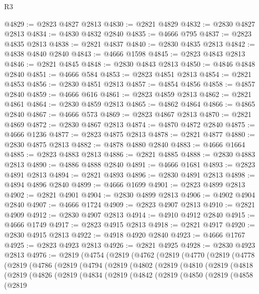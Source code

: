 \begin{lexlean}{R3}
\begin{coremodule}
@4829 := @2823 @4827 @2813
@4830 := @2821 @4829
@4832 := @2830 @4827 @2813
@4834 := @4830 @4832 @2840
@4835 := @4666 @795
@4837 := @2823 @4835 @2813
@4838 := @2821 @4837
@4840 := @2830 @4835 @2813
@4842 := @4838 @4840 @2840
@4843 := @4666 @1598
@4845 := @2823 @4843 @2813
@4846 := @2821 @4845
@4848 := @2830 @4843 @2813
@4850 := @4846 @4848 @2840
@4851 := @4666 @584
@4853 := @2823 @4851 @2813
@4854 := @2821 @4853
@4856 := @2830 @4851 @2813
@4857 := @4854 @4856
@4858 := @4857 @2840
@4859 := @4666 @616
@4861 := @2823 @4859 @2813
@4862 := @2821 @4861
@4864 := @2830 @4859 @2813
@4865 := @4862 @4864
@4866 := @4865 @2840
@4867 := @4666 @573
@4869 := @2823 @4867 @2813
@4870 := @2821 @4869
@4872 := @2830 @4867 @2813
@4874 := @4870 @4872 @2840
@4875 := @4666 @1236
@4877 := @2823 @4875 @2813
@4878 := @2821 @4877
@4880 := @2830 @4875 @2813
@4882 := @4878 @4880 @2840
@4883 := @4666 @1664
@4885 := @2823 @4883 @2813
@4886 := @2821 @4885
@4888 := @2830 @4883 @2813
@4890 := @4886 @4888 @2840
@4891 := @4666 @1681
@4893 := @2823 @4891 @2813
@4894 := @2821 @4893
@4896 := @2830 @4891 @2813
@4898 := @4894 @4896 @2840
@4899 := @4666 @1699
@4901 := @2823 @4899 @2813
@4902 := @2821 @4901
@4904 := @2830 @4899 @2813
@4906 := @4902 @4904 @2840
@4907 := @4666 @1724
@4909 := @2823 @4907 @2813
@4910 := @2821 @4909
@4912 := @2830 @4907 @2813
@4914 := @4910 @4912 @2840
@4915 := @4666 @1749
@4917 := @2823 @4915 @2813
@4918 := @2821 @4917
@4920 := @2830 @4915 @2813
@4922 := @4918 @4920 @2840
@4923 := @4666 @1767
@4925 := @2823 @4923 @2813
@4926 := @2821 @4925
@4928 := @2830 @4923 @2813
@4976 := @2819
    (@4754
      (@2819
        (@4762
          (@2819
            (@4770
              (@2819
                (@4778
                  (@2819
                    (@4786
                      (@2819
                        (@4794
                          (@2819
                            (@4802
                              (@2819
                                (@4810
                                  (@2819
                                    (@4818
                                      (@2819
                                        (@4826
                                          (@2819
                                            (@4834
                                              (@2819
                                                (@4842
                                                  (@2819
                                                    (@4850
                                                      (@2819
                                                        (@4858
                                                          (@2819

\end{coremodule}
\end{lexlean}
